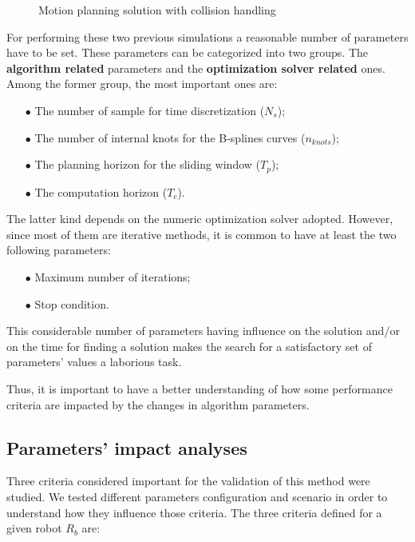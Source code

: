 \documentclass[eprint]{actapoly}
\begin{document}
\begin{figure}
  \caption{Motion planning solution with collision handling\label{fig:nocollision}}
\label{fig:res}
\end{figure}

For performing these two previous simulations a reasonable number of parameters have to be set. These parameters can be categorized into two groups. The \textbf{algorithm related} parameters and the \textbf{optimization solver related} ones.
Among the former group, the most important ones are:
\begin{itemize}
\item[$\bullet$] The number of sample for time discretization ($N_s$);
\item[$\bullet$] The number of internal knots for the B-splines curves ($n_{knots}$);
\item[$\bullet$] The planning horizon for the sliding window ($T_p$);
\item[$\bullet$] The computation horizon ($T_c$).
\end{itemize}

The latter kind depends on the numeric optimization solver adopted.
However, since most of them are iterative methods, it is common
to have at least the two following parameters:
\begin{itemize}
\item[$\bullet$] Maximum number of iterations;
\item[$\bullet$] Stop condition.
\end{itemize}


This considerable number of parameters having influence on the solution
and/or on the time for finding a solution makes the search for a
satisfactory set of parameters' values a laborious task.

Thus, it is important to have a better understanding of how some
performance criteria are impacted by the changes in algorithm
parameters.

\subsection{Parameters' impact analyses}

Three criteria considered important for the validation of this method were studied.
We tested different parameters configuration and scenario in order to 
understand how they influence
those criteria.
The three criteria defined for a given robot $R_b$ are:
\end{document}
